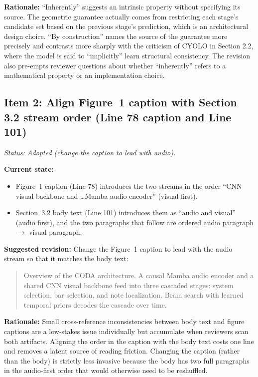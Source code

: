 \documentclass{article}
\begin{document}
\textbf{Rationale:}
``Inherently'' suggests an intrinsic property without specifying its source. The geometric guarantee actually comes from restricting each stage's candidate set based on the previous stage's prediction, which is an architectural design choice. ``By construction'' names the source of the guarantee more precisely and contrasts more sharply with the criticism of CYOLO in Section 2.2, where the model is said to ``implicitly'' learn structural consistency. The revision also pre-empts reviewer questions about whether ``inherently'' refers to a mathematical property or an implementation choice.

\subsection*{Item 2: Align Figure~1 caption with Section 3.2 stream order (Line 78 caption and Line 101)}

\textit{Status: Adopted (change the caption to lead with audio).}

\textbf{Current state:}
\begin{itemize}
    \item Figure~1 caption (Line 78) introduces the two streams in the order ``CNN visual backbone and \ldots Mamba audio encoder'' (visual first).
    \item Section~3.2 body text (Line 101) introduces them as ``audio and visual'' (audio first), and the two paragraphs that follow are ordered audio paragraph $\to$ visual paragraph.
\end{itemize}

\textbf{Suggested revision:}
Change the Figure~1 caption to lead with the audio stream so that it matches the body text:
\begin{quote}
Overview of the CODA architecture. A causal Mamba audio encoder and a shared CNN visual backbone feed into three cascaded stages: system selection, bar selection, and note localization. Beam search with learned temporal priors decodes the cascade over time.
\end{quote}

\textbf{Rationale:}
Small cross-reference inconsistencies between body text and figure captions are a low-stakes issue individually but accumulate when reviewers scan both artifacts. Aligning the order in the caption with the body text costs one line and removes a latent source of reading friction. Changing the caption (rather than the body) is strictly less invasive because the body has two full paragraphs in the audio-first order that would otherwise need to be reshuffled.
\end{document}
